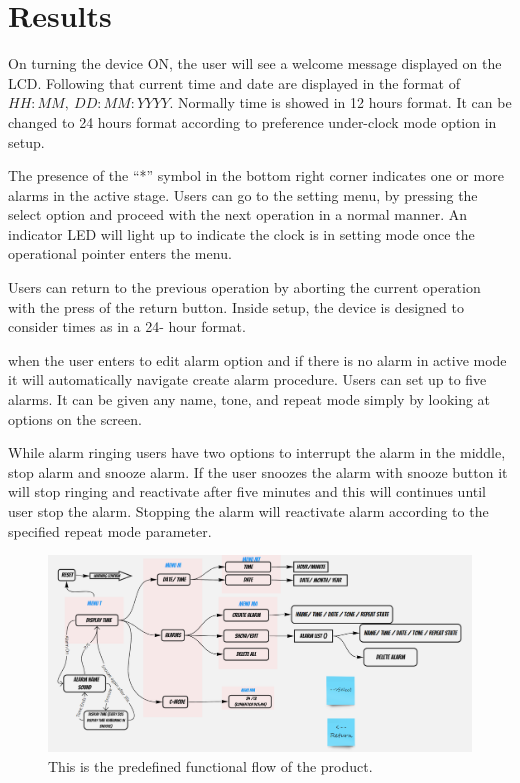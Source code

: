 \documentclass[12pt,twocolumn]{article}
\begin{document}
\section{Results}
On turning the device ON, the user will see a welcome message displayed on the LCD. Following that 
current time and date are displayed in the format of $HH:MM,\ DD:MM:YYYY$. Normally time is showed 
in 12 hours format. It can be changed to 24 hours format according to preference under-clock mode 
option in setup. 

The presence of the “*” symbol in the bottom right corner indicates one or more alarms in the active
stage. Users can go to the setting menu, by pressing the select option and proceed with the next 
operation in a normal manner. An indicator LED will light up to indicate the clock is in setting 
mode once the operational pointer enters the menu. 

Users can return to the previous operation by aborting the current operation with the press of the 
return button. Inside setup, the device is designed to consider times as in a 24- hour format.\par when
the user enters to edit alarm option and if there is no alarm in active mode it will automatically 
navigate create alarm procedure. Users can set up to five alarms. It can be given any name, tone, 
and repeat mode simply by looking at options on the screen.

While alarm ringing users have two options to interrupt the alarm in the middle, stop alarm and snooze 
alarm. If the user snoozes the alarm with snooze button it will stop ringing and reactivate after five
minutes and this will continues until user stop the alarm. Stopping the alarm will reactivate
alarm according to the specified repeat mode parameter.
\onecolumn
\begin{center}
    \begin{figure}[h]
    \includegraphics[width=\textwidth]{flow}
    \caption{This is the predefined functional flow of the product.}
    \end{figure}
\end{center}
\end{document}
